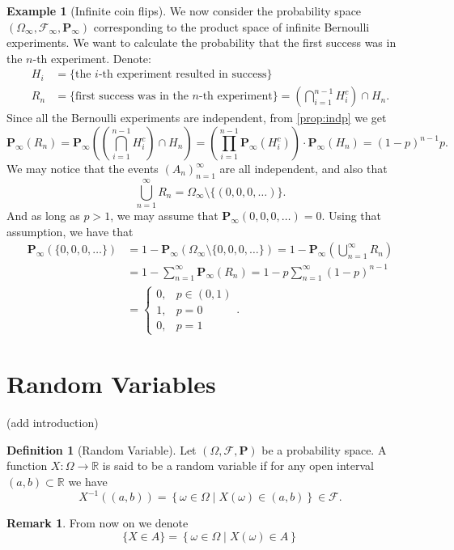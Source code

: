 \documentclass[11pt,a4paper]{article}
\theoremstyle{definition}
\newtheorem{definition}{Definition}[section]
\newtheorem{remark}{Remark}[section]
\newtheorem{example}{Example}[section]
\theoremstyle{plain}
\newcommand{\R}{\mathbb{R}}
\newcommand{\set}[2]{ \left\{ #1 \mid #2 \right\} }
\begin{document}
  \begin{example}[Infinite coin flips]
    We now consider the probability space 
    $(\Omega_{\infty}, \mathcal F_{\infty}, \mathbf P_{\infty})$
    corresponding to the product space of infinite Bernoulli experiments.
    We want to calculate the probability that the first success was in 
    the $n$-th experiment. Denote:
    \begin{align*}
      H_i &= \{\text{the $i$-th experiment resulted in success}\} \\
      R_n &= \{\text{first success was in the $n$-th experiment}\} = 
      \left(\bigcap_{i=1}^{n-1} H_i^c\right) \cap H_n.
    \end{align*}
    Since all the Bernoulli experiments are independent, from 
    \autoref{prop:indp} we get
    \[
      \mathbf{P}_{\infty}(R_{n}) = 
      \mathbf{P}_{\infty} \left(\left(\bigcap_{i=1}^{n-1} H_i^c\right) \cap H_n\right) = 
      \left(\prod_{i=1}^{n-1} \mathbf{P}_{\infty} \left(H_{i}^{c}\right)\right) \cdot \mathbf{P}_{\infty} \left(H_{n}\right) =
      (1-p)^{n-1}p.
    \]
    We may notice that the events $(A_n)_{n=1}^{\infty}$ are all independent,
    and also that
    \[
      \bigcup_{n=1}^{\infty} R_n = \Omega_\infty \setminus \{(0,0,0,\dots)\}.
    \]
    And as long as $p > 1$, we may assume that 
    $\mathbf P_\infty(0,0,0,\dots) = 0$.
    Using that assumption, we have that
    \begin{align*}
      \mathbf P_{\infty}(\{0,0,0,\dots\}) &= 
      1 - \mathbf P_\infty(\Omega_\infty \setminus \{0,0,0,\dots\}) =
      1 - \mathbf P_\infty(\bigcup_{n=1}^{\infty} R_n) \\ &=
      1 - \sum_{n=1}^{\infty} \mathbf P_\infty(R_n) =
      1 - p \sum_{n=1}^{\infty} (1-p)^{n-1} \\ &=
      \begin{cases}
        0, &p \in (0,1) \\
        1, &p = 0 \\
        0, &p = 1
      \end{cases}.
    \end{align*}
  \end{example}

  \newpage

  \section{Random Variables}
  (add introduction)
  \begin{definition}[Random Variable]
    Let $(\Omega, \mathcal F, \mathbf P)$ be a probability space.
    A function $X \colon \Omega \to \R$ is said to be a random variable if for
    any open interval $(a,b) \subset \R$ we have
    \[
      X^{-1}\left((a,b)\right) = 
      \set{\omega \in \Omega}{X(\omega) \in (a,b)} \in \mathcal F.
    \]
  \end{definition}
  \begin{remark}
    From now on we denote
    \[
      \{X \in A\} = \set{\omega \in \Omega}{X(\omega) \in A}
    \]
  \end{remark}
  
\end{document}
